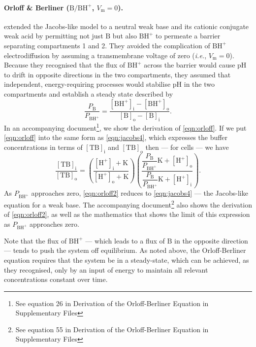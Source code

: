 \documentclass[fleqn,10pt]{physiome}
\begin{document}
\paragraph{Orloff \& Berliner ($\mathrm{B}/\mathrm{BH^+}$, $V_\mathrm{m}=0$).}

\cite{orloff1956mechanism} extended the Jacobs-like model to a neutral weak base and its cationic conjugate weak acid by permitting not just $\mathrm{B}$ but also $\mathrm{BH^+}$ to permeate a barrier separating compartments 1 and 2. They avoided the complication of $\mathrm{BH^+}$ electrodiffusion by assuming a transmembrane voltage of zero (\emph{i.e.}, $V_\mathrm{m}=0$). Because they recognised that the flux of $\mathrm{BH^+}$ across the barrier would cause $\mathrm{pH}$ to drift in opposite directions in the two compartments, they assumed that independent, energy-requiring processes would stabilise $\mathrm{pH}$ in the two compartments and establish a steady state described by
\begin{equation}
\dfrac{P_\mathrm{B}}{P_\mathrm{BH^+}}=\dfrac{\mathrm{[BH^+]_i}-\mathrm{[BH^+]_o}}{\mathrm{[B]_o}-\mathrm{[B]_i}}.
\label{eqn:orloff}
\end{equation}
In an accompanying document\footnote{See equation 26 in Derivation of the Orloff-Berliner Equation in Supplementary Files}, we show the derivation of \autoref{eqn:orloff}. If we put \autoref{eqn:orloff} into the same form as \autoref{eqn:jacobs4}, which expresses the buffer concentrations in terms of $\mathrm{[TB]_i}$ and $\mathrm{[TB]_o}$ then --- for cells --- we have
\begin{equation}
\dfrac{\mathrm{[TB]_i}}{\mathrm{[TB]_o}}=\left(\dfrac{\mathrm{[H^+]_i}+\mathrm{K}}{\mathrm{[H^+]_o}+\mathrm{K}}\right)\left( \dfrac{\dfrac{P_\mathrm{B}}{P_\mathrm{BH^+}}\mathrm{K}+\mathrm{[H^+]_o}}{\dfrac{P_\mathrm{B}}{P_\mathrm{BH^+}}\mathrm{K}+\mathrm{[H^+]_i}}\right).
\label{eqn:orloff2}
\end{equation}
As $P_\mathrm{BH^+}$ approaches zero, \autoref{eqn:orloff2} reduces to \autoref{eqn:jacobs4} --- the Jacobs-like equation for a weak base. The accompanying document\footnote{See equation 55 in Derivation of the Orloff-Berliner Equation in Supplementary Files} also shows the derivation of \autoref{eqn:orloff2}, as well as the mathematics that shows the limit of this expression as $P_\mathrm{BH^+}$ approaches zero.

Note that the flux of $\mathrm{BH^+}$ --- which leads to a flux of $\mathrm{B}$ in the opposite direction --- tends to push the system off equilibrium. As noted above, the Orloff-Berliner equation requires that the system be in a steady-state, which can be achieved, as they recognised, only by an input of energy to maintain all relevant concentrations constant over time.
\end{document}
